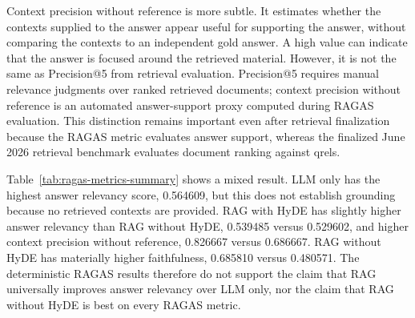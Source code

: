 Context precision without reference is more subtle. It estimates whether the contexts supplied to the answer appear useful for supporting the answer, without comparing the contexts to an independent gold answer. A high value can indicate that the answer is focused around the retrieved material. However, it is not the same as Precision@5 from retrieval evaluation. Precision@5 requires manual relevance judgments over ranked retrieved documents; context precision without reference is an automated answer-support proxy computed during RAGAS evaluation. This distinction remains important even after retrieval finalization because the RAGAS metric evaluates answer support, whereas the finalized June 2026 retrieval benchmark evaluates document ranking against qrels.

\begin{table}[h]
\centering
\caption{Deterministic June 2026 RAGAS metrics by configuration.}
\label{tab:ragas-metrics-summary}
\small
\setlength{\tabcolsep}{4pt}

\end{table}

Table~\ref{tab:ragas-metrics-summary} shows a mixed result. LLM only has the highest answer relevancy score, 0.564609, but this does not establish grounding because no retrieved contexts are provided. RAG with HyDE has slightly higher answer relevancy than RAG without HyDE, 0.539485 versus 0.529602, and higher context precision without reference, 0.826667 versus 0.686667. RAG without HyDE has materially higher faithfulness, 0.685810 versus 0.480571. The deterministic RAGAS results therefore do not support the claim that RAG universally improves answer relevancy over LLM only, nor the claim that RAG without HyDE is best on every RAGAS metric.

